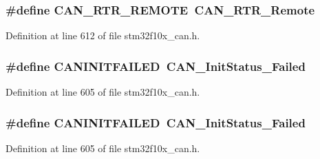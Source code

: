 \subsubsection[{\texorpdfstring{C\+A\+N\+\_\+\+R\+T\+R\+\_\+\+R\+E\+M\+O\+TE}{CAN_RTR_REMOTE}}]{\setlength{\rightskip}{0pt plus 5cm}\#define C\+A\+N\+\_\+\+R\+T\+R\+\_\+\+R\+E\+M\+O\+TE~{\bf C\+A\+N\+\_\+\+R\+T\+R\+\_\+\+Remote}}\hypertarget{group___c_a_n___legacy_gab15c649e3e497c6d1145bb98ff7f3f04}{}\label{group___c_a_n___legacy_gab15c649e3e497c6d1145bb98ff7f3f04}


Definition at line 612 of file stm32f10x\+\_\+can.\+h.

\subsubsection[{\texorpdfstring{C\+A\+N\+I\+N\+I\+T\+F\+A\+I\+L\+ED}{CANINITFAILED}}]{\setlength{\rightskip}{0pt plus 5cm}\#define C\+A\+N\+I\+N\+I\+T\+F\+A\+I\+L\+ED~{\bf C\+A\+N\+\_\+\+Init\+Status\+\_\+\+Failed}}\hypertarget{group___c_a_n___legacy_ga0539a9e5a898fcd71c4dcb7e341e4b86}{}\label{group___c_a_n___legacy_ga0539a9e5a898fcd71c4dcb7e341e4b86}


Definition at line 605 of file stm32f10x\+\_\+can.\+h.

\subsubsection[{\texorpdfstring{C\+A\+N\+I\+N\+I\+T\+F\+A\+I\+L\+ED}{CANINITFAILED}}]{\setlength{\rightskip}{0pt plus 5cm}\#define C\+A\+N\+I\+N\+I\+T\+F\+A\+I\+L\+ED~{\bf C\+A\+N\+\_\+\+Init\+Status\+\_\+\+Failed}}\hypertarget{group___c_a_n___legacy_ga0539a9e5a898fcd71c4dcb7e341e4b86}{}\label{group___c_a_n___legacy_ga0539a9e5a898fcd71c4dcb7e341e4b86}


Definition at line 605 of file stm32f10x\+\_\+can.\+h.

